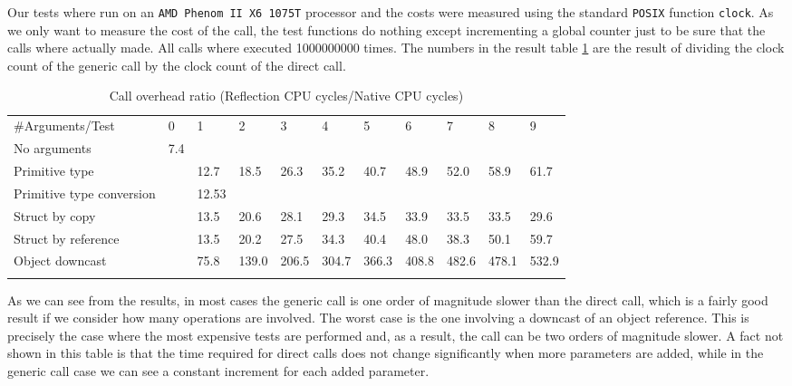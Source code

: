 Our tests where run on an \texttt{AMD Phenom II X6 1075T} processor and the costs were measured using the standard \texttt{POSIX} function \texttt{clock}.
As we only want to measure the cost of the call, the test functions do nothing except incrementing a global counter just to be sure that the calls where
actually made. All calls where executed 1000000000 times. The numbers in the result table \ref{tab:overhead} are the result of dividing the clock count of the generic call
by the clock count of the direct call.

\begin{landscape}
 

\begin{table}
\caption {Call overhead ratio (Reflection CPU cycles/Native CPU cycles)} \label{tab:overhead} 

\begin{center}

\begin{tabular}{lllllllllll}
\hline\noalign{\smallskip}
\#Arguments/Test & 0 & 1 & 2 & 3 & 4 & 5 & 6 & 7 & 8 & 9\\
\noalign{\smallskip}
\hline
\noalign{\smallskip}
No arguments & 7.4 &&&&&&&&&\\
Primitive type && 12.7 & 18.5 & 26.3 & 35.2 & 40.7 & 48.9 & 52.0 & 58.9 & 61.7\\
Primitive type conversion && 12.53 &&&&&&&&\\
Struct by copy && 13.5 & 20.6 & 28.1 & 29.3 & 34.5 & 33.9 & 33.5 & 33.5 & 29.6\\
Struct by reference && 13.5 & 20.2 & 27.5 & 34.3 & 40.4 & 48.0 & 38.3 & 50.1 & 59.7\\
Object downcast && 75.8 & 139.0 & 206.5 & 304.7 & 366.3 & 408.8 & 482.6 & 478.1 & 532.9\\
\noalign{\smallskip}
\hline
\end{tabular}

\end{center}
\end{table}
\end{landscape}

As we can see from the results, in most cases the generic call is one order of magnitude slower than the direct call, which is a fairly good result
if we consider how many operations are involved. The worst case is the one involving a downcast of an object reference. This is precisely the case
where the most expensive tests are performed and, as a result, the call can be two orders of magnitude slower. A fact not shown in this table is that
the time required for direct calls does not change significantly when more parameters are added, while in the generic call case we can see a
constant increment for each added parameter.

